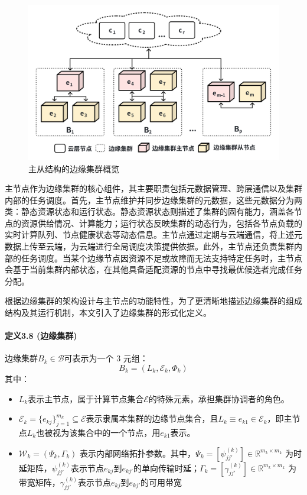 \begin{figure}[h]
  \centering
  \includegraphics[width=0.8\linewidth]{pics/3-5边缘集群.png}
  \caption{主从结构的边缘集群概览}
  \label{fig:3-5edgecluster}
\end{figure}

主节点作为边缘集群的核心组件，其主要职责包括元数据管理、跨层通信以及集群内部的任务调度。首先，主节点维护并同步边缘集群的元数据，这些元数据分为两类：静态资源状态和运行状态。静态资源状态则描述了集群的固有能力，涵盖各节点的资源供给情况、计算能力；运行状态反映集群的动态行为，包括各节点负载的实时计算队列、节点健康状态等动态信息。主节点通过定期与云端通信，将上述元数据上传至云端，为云端进行全局调度决策提供依据。此外，主节点还负责集群内部的任务调度。当某个边缘节点因资源不足或故障而无法支持特定任务时，主节点会基于当前集群内部状态，在其他具备适配资源的节点中寻找最优候选者完成任务分配。

根据边缘集群的架构设计与主节点的功能特性，为了更清晰地描述边缘集群的组成结构及其运行机制，本文引入了边缘集群的形式化定义。

\paragraph{定义3.8 (边缘集群)} 边缘集群$B_k \in \mathcal{B}$可表示为一个 3 元组：
\[
B_k = (L_k, \mathcal{E}_k, \Phi_k)
\]
其中：
\begin{itemize}
    \item $L_k$表示主节点，属于计算节点集合$\mathcal{E}$的特殊元素，承担集群协调者的角色。
    \item $\mathcal{E}_k = \{e_{kj}\}_{j=1}^{m_k} \subseteq \mathcal{E}$表示隶属本集群的边缘节点集合，且$L_k \equiv e_{k1} \in \mathcal{E}_k$，即主节点$L_k$也被视为该集合中的一个节点，用$e_{k1}$表示。
    \item $\mathcal{W}_k = (\Psi_k, \Gamma_k)$ 表示内部网络拓扑参数。其中，$\Psi_k = [\psi_{jj'}^{(k)}] \in \mathbb{R}^{m_k \times m_k}$ 为时延矩阵，$\psi_{jj'}^{(k)}$表示节点$e_{kj}$到$e_{kj'}$的单向传输时延；$\Gamma_k = [\gamma_{jj'}^{(k)}] \in \mathbb{R}^{m_k \times m_k}$ 为带宽矩阵，$\gamma_{jj'}^{(k)}$表示节点$e_{kj}$到$e_{kj'}$的可用带宽
\end{itemize}



